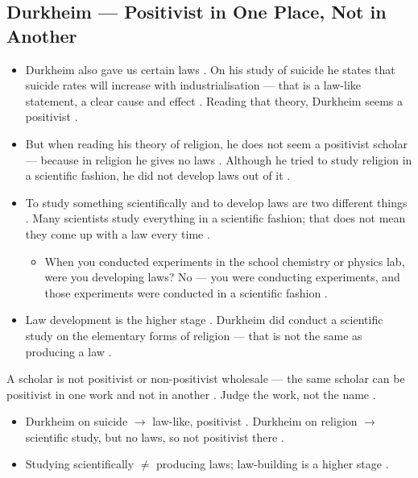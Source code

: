\subsection{Durkheim --- Positivist in One Place, Not in Another}
\begin{itemize}
    \item Durkheim also gave us certain laws . On his study of suicide he states that suicide rates will increase with industrialisation --- that is a law-like statement, a clear cause and effect . Reading that theory, Durkheim seems a positivist .
    \item But when reading his theory of religion, he does not seem a positivist scholar --- because in religion he gives no laws . Although he tried to study religion in a scientific fashion, he did not develop laws out of it .
    \item To study something scientifically and to develop laws are two different things . Many scientists study everything in a scientific fashion; that does not mean they come up with a law every time .
    \begin{itemize}
        \item When you conducted experiments in the school chemistry or physics lab, were you developing laws? No --- you were conducting experiments, and those experiments were conducted in a scientific fashion .
    \end{itemize}
    \item Law development is the higher stage . Durkheim did conduct a scientific study on the elementary forms of religion --- that is not the same as producing a law .
\end{itemize}

\begin{CriticalPoint}
A scholar is not positivist or non-positivist wholesale --- the same scholar can be positivist in one work and not in another . Judge the work, not the name .
\end{CriticalPoint}

\begin{QuickRevision}
\begin{itemize}
    \item Durkheim on suicide $\rightarrow$ law-like, positivist . Durkheim on religion $\rightarrow$ scientific study, but no laws, so not positivist there .
    \item Studying scientifically $\neq$ producing laws; law-building is a higher stage .
\end{itemize}
\end{QuickRevision}

